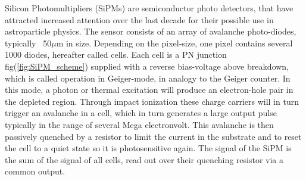 \documentclass[12pt,article,type=msc,colorback,accentcolor=tud9c]{tudthesis}
\begin{document}
Silicon Photomultipliers (SiPMs) are semiconductor photo detectors, that have attracted increased attention over the last decade for their possible use in astroparticle physics. The sensor consists of an array of avalanche photo-diodes, typically ~50$\mu$m in size. Depending on the pixel-size, one pixel contains several 1000 diodes, hereafter called cells. Each cell is a PN junction fig(\ref{fig:SiPM_scheme}) supplied with a reverse bias-voltage above breakdown, which is called operation in Geiger-mode, in analogy to the Geiger counter. In this mode, a photon or thermal excitation will produce an electron-hole pair in the depleted region. Through impact ionization these charge carriers will in turn trigger an avalanche in a cell, which in turn generates a large output pulse typically in the range of several Mega electronvolt. This avalanche is then passively quenched by a resistor to limit the current in the substrate and to reset the cell to a quiet state so it is photosensitive again. The signal of the SiPM is the sum of the signal of all cells, read out over their quenching resistor via a common output.\\

\begin{figure}[h]
\begin{centering}
}
\caption{Structure and carrier multiplication through an avalanche inside a SiPM. Picture from \cite{HPK_SiPM}}
\label{fig:SiPM_scheme}
\end{centering}
\end{figure}
\end{document}
